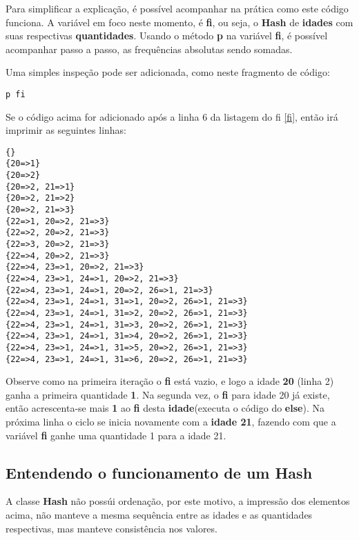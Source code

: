 \documentclass[espaco=simples,appendix=Name]{abnt}
\newcommand{\code}[1] {\textbf{#1}}
\begin{document}
Para simplificar a explicação, é possível acompanhar na prática como este código funciona. A variável em foco neste momento, é \code{fi}, ou seja, o \code{Hash} de \code{idades} com suas respectivas \textbf{quantidades}.
 Usando o método \code{p} na variável \code{fi}, é possível acompanhar passo a passo, as frequências absolutas sendo somadas.

Uma simples inspeção pode ser adicionada, como neste fragmento de código:

\begin{lstlisting}[caption=Inspecionando a soma dos elementos, emph=2]
  p fi
\end{lstlisting}

Se o código acima for adicionado após a linha 6 da listagem do fi \ref{fi}, então irá imprimir as seguintes linhas:

\begin{lstlisting}[caption=inspeção da variável \code{fi} ]
{}
{20=>1}
{20=>2}
{20=>2, 21=>1}
{20=>2, 21=>2}
{20=>2, 21=>3}
{22=>1, 20=>2, 21=>3}
{22=>2, 20=>2, 21=>3}
{22=>3, 20=>2, 21=>3}
{22=>4, 20=>2, 21=>3}
{22=>4, 23=>1, 20=>2, 21=>3}
{22=>4, 23=>1, 24=>1, 20=>2, 21=>3}
{22=>4, 23=>1, 24=>1, 20=>2, 26=>1, 21=>3}
{22=>4, 23=>1, 24=>1, 31=>1, 20=>2, 26=>1, 21=>3}
{22=>4, 23=>1, 24=>1, 31=>2, 20=>2, 26=>1, 21=>3}
{22=>4, 23=>1, 24=>1, 31=>3, 20=>2, 26=>1, 21=>3}
{22=>4, 23=>1, 24=>1, 31=>4, 20=>2, 26=>1, 21=>3}
{22=>4, 23=>1, 24=>1, 31=>5, 20=>2, 26=>1, 21=>3}
{22=>4, 23=>1, 24=>1, 31=>6, 20=>2, 26=>1, 21=>3}
\end{lstlisting}

Observe como na primeira iteração o \code{fi} está vazio, e logo a idade \code{20} (linha 2) ganha a primeira quantidade \code{1}. Na segunda vez, o \code{fi} para idade 20 já existe, então acrescenta-se mais \code{1} ao \code{fi} desta \code{idade}(executa o código do \code{else}). Na próxima linha o ciclo se inicia novamente com a \textbf{idade 21}, fazendo com que a variável \code{fi} ganhe uma quantidade 1 para a idade 21.


\subsection { Entendendo o funcionamento de um Hash }

A classe \code{Hash} não possúi ordenação, por este motivo, a impressão dos elementos acima, não manteve a mesma sequência entre as idades e as quantidades respectivas, mas manteve consistência nos valores.
\end{document}
